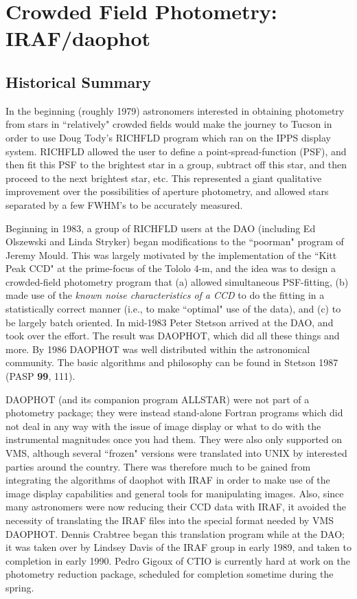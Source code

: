 \section{Crowded Field Photometry: IRAF/daophot} 
\subsection{Historical Summary}
 
In the beginning (roughly 1979) astronomers 
interested in obtaining photometry from stars in ``relatively" crowded fields
would make the journey to Tucson in order to use Doug Tody's RICHFLD
program which ran on the IPPS display system. 
RICHFLD allowed the user to define a
point-spread-function (PSF), and then fit this PSF to the brightest star
in a group, subtract off this star, and then proceed to the next
brightest star, etc.  This represented a giant qualitative improvement
over the possibilities of aperture photometry, and allowed stars
separated by a few FWHM's to be accurately measured.  
 
Beginning in 1983, a group of RICHFLD users at the DAO (including
Ed Olszewski and Linda Stryker) began modifications to the ``poorman"
program of Jeremy Mould. This was largely motivated by the
implementation of the ``Kitt Peak CCD" at the prime-focus of the Tololo
4-m, and the idea was to design a crowded-field
photometry
program that (a) allowed simultaneous PSF-fitting,  (b) made
use of the {\it known noise characteristics of a CCD} to do the fitting
in a
statistically correct manner (i.e., to make ``optimal" use of the data),
and (c) to be largely batch oriented.
In mid-1983 Peter Stetson arrived at the DAO, and took over
the effort.  The result was
DAOPHOT, which did all these things and more. 
By 1986 DAOPHOT was well distributed within the astronomical community.
The basic algorithms and philosophy can be found in Stetson 1987 (PASP
{\bf 99}, 111).
 
DAOPHOT (and its companion program ALLSTAR) were not part of a
photometry
package; they were instead stand-alone Fortran
programs which did not deal in any way with the issue of image display
or what to do with the instrumental magnitudes once you had them.  They
were also only supported on VMS, although several ``frozen" versions
were translated into UNIX by interested parties around the country.  
There was therefore
much to be gained from integrating the algorithms of daophot 
with IRAF in order to make use of
the image display capabilities and general tools for manipulating
images.  Also, since many astronomers were now reducing their CCD data
with IRAF, it avoided the necessity of translating the IRAF files into
the special format needed by VMS DAOPHOT.  Dennis Crabtree began this
translation program while at the DAO; it was taken over by Lindsey Davis
of the IRAF group in early 1989, and taken to completion in early 1990.
Pedro Gigoux of CTIO is currently hard at work on the photometry
reduction package, scheduled for completion sometime during the spring.
 
